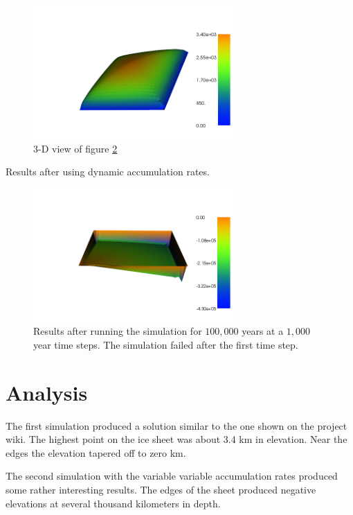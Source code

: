 \documentclass{article}%
\begin{document}
    \begin{figure}[ht!]
        \centering
        \includegraphics[width=3in]{../img/constant.png} 
        \caption{ 3-D view of figure \ref{constant} }
        \label{constant3d}
    \end{figure}

    Results after using dynamic accumulation rates. 

    \begin{figure}[h!]
        \centering
        \includegraphics[width=3in]{../img/variable.png} 
        \caption{ Results after running the simulation for $100,000$ years at a $1,000$ year time steps. The simulation failed after the first time step.}
        \label{constant}
    \end{figure}

    \newpage
    \section{Analysis}

    The first simulation produced a solution similar to the one shown on the project wiki. The highest point on the ice sheet was about 3.4 km in elevation. Near the edges the elevation tapered off to zero km. 

    The second simulation with the variable variable accumulation rates produced some rather interesting results. The edges of the sheet produced negative elevations at several thousand kilometers in depth. 
    
\end{document}
